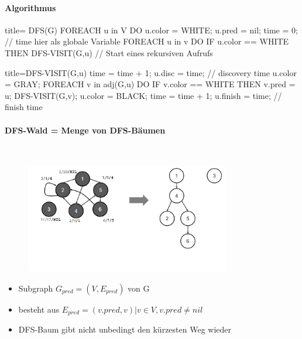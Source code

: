 \documentclass[
    ngerman,
    color=3b,
    dark_mode,
    load_common, %
    summary,
    boxarc,
]{tuda_summary}
\begin{document}
\paragraph{Algorithmus}\mbox{}
\begin{codeBlock}[autogobble]{title={ DFS(G)}}
FOREACH u in V DO
    u.color = WHITE;
    u.pred = nil;
time = 0;               // time hier als globale Variable
FOREACH u in v DO
    IF u.color == WHITE THEN
        DFS-VISIT(G,u)  // Start eines rekursiven Aufrufs
\end{codeBlock}
\begin{codeBlock}[autogobble]{title={DFS-VISIT(G,u)}}
time = time + 1;
u.disc = time;          // discovery time
u.color = GRAY;
FOREACH v in adj(G,u) DO
    IF v.color == WHITE THEN
        v.pred = u;
        DFS-VISIT(G,v);
u.color = BLACK;
time = time + 1;
u.finish = time;        // finish time
\end{codeBlock}

\paragraph{DFS-Wald = Menge von DFS-Bäumen}\mbox{}\vspace{-2em}\\
\begin{figure}
    \centering
    \includegraphics[width=9cm,trim={0 2.2cm 0 0},clip]{pictures/dfswald.PNG}
\end{figure}
\begin{itemize}
    \item Subgraph $G_{pred}=(V,E_{pred})$ von G
    \item besteht aus $E_{pred} = {(v.pred,v)|v \in V, v.pred \neq nil}$
    \item DFS-Baum gibt nicht unbedingt den kürzesten Weg wieder
\end{itemize}
\vspace*{1cm}
\end{document}
